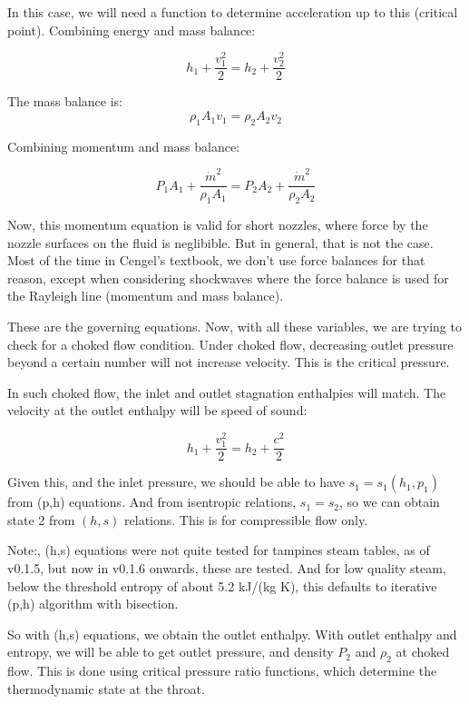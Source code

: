 \documentclass[masters]{ucbthesis}
\renewcommand{\_}{\kern-1.5pt\textunderscore\kern-1.5pt}
\begin{document}
In this case, we will need a function to determine acceleration up to 
this (critical point). Combining energy and mass balance:

\begin{equation*}
	h_1 + \frac{v_1^2}{2} = h_2 + \frac{v_2^2}{2}
\end{equation*}

The mass balance is:
\begin{equation*}
	\rho_1 A_1 v_1 = \rho_2 A_2 v_2
\end{equation*}

Combining momentum and mass balance:

\begin{equation*}
	P_1 A_1 +  
	\frac{\dot{m}^2}{\rho_1 A_1} 
	= 
	P_{2} A_2 +
	\frac{\dot{m}^2}{\rho_2 A_2}
\end{equation*}

Now, this momentum equation is valid for short nozzles, where force 
by the nozzle surfaces on the fluid is neglibible. But in general,
that is not the case. Most of the time in Cengel's textbook, we don't 
use force balances for that reason, except when considering shockwaves 
where the force balance is used for the Rayleigh line (momentum and 
mass balance).

These are the governing equations. Now, with all these variables, we 
are trying to check for a choked flow condition. Under choked flow,
decreasing outlet pressure beyond a certain number 
will not increase velocity. This is the critical pressure.

In such choked flow, the inlet and outlet stagnation enthalpies will 
match. The velocity at the outlet enthalpy will be speed of sound:

\begin{equation*}
	h_1 + \frac{v_1^2}{2} = h_2 + \frac{c^2}{2}
\end{equation*}

Given this, and the inlet pressure, we should be able to have 
$s_1 = s_1 (h_1,p_1)$ from (p,h) equations. And from isentropic 
relations, $s_1 = s_2$, so we can obtain state 2 from $(h,s)$ relations.
This is for compressible flow only.


Note:, (h,s) equations were not quite tested for tampines steam tables,
as of v0.1.5, but now in v0.1.6 onwards, these are tested. And for low 
quality steam, below the threshold entropy of about 5.2 kJ/(kg K), this 
defaults to iterative (p,h) algorithm with bisection.

So with (h,s) equations, we obtain the outlet enthalpy. With outlet 
enthalpy and entropy, we will be able to get outlet pressure, and 
density $P_2$ and $\rho_2$ at choked flow. This is done using 
critical pressure ratio functions, which determine the thermodynamic 
state at the throat.
\end{document}
